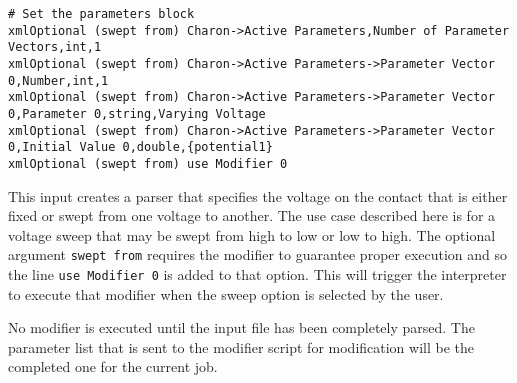 \begin{lstlisting}
# Set the parameters block
xmlOptional (swept from) Charon->Active Parameters,Number of Parameter Vectors,int,1
xmlOptional (swept from) Charon->Active Parameters->Parameter Vector 0,Number,int,1
xmlOptional (swept from) Charon->Active Parameters->Parameter Vector 0,Parameter 0,string,Varying Voltage
xmlOptional (swept from) Charon->Active Parameters->Parameter Vector 0,Initial Value 0,double,{potential1}
xmlOptional (swept from) use Modifier 0
\end{lstlisting}

This input creates a parser that specifies the voltage on the contact
that is either fixed or swept from one voltage to another.  The use
case described here is for a voltage sweep that may be swept from high
to low or low to high.  The optional argument \texttt{swept from}
requires the modifier to guarantee proper execution and so the line
\texttt{use Modifier 0} is added to that option.  This will trigger
the interpreter to execute that modifier when the sweep option is
selected by the user.

No modifier is executed until the input file has been completely
parsed.  The parameter list that is sent to the modifier script for
modification will be the completed one for the current job.

